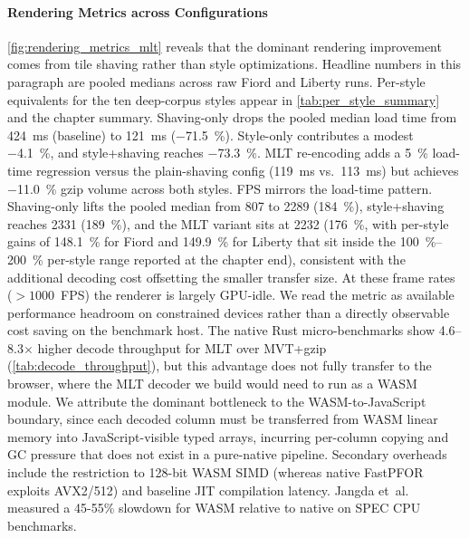 \paragraph{Rendering Metrics across Configurations}
\cref{fig:rendering_metrics_mlt} reveals that the dominant rendering improvement comes from tile shaving rather than style optimizations.
Headline numbers in this paragraph are pooled medians across raw Fiord and Liberty runs.
Per-style equivalents for the ten deep-corpus styles appear in \cref{tab:per_style_summary} and the chapter summary.
Shaving-only drops the pooled median load time from \qty{424}{\milli\second} (baseline) to \qty{121}{\milli\second} (\qty{-71.5}{\percent}).
Style-only contributes a modest \qty{-4.1}{\percent}, and style+shaving reaches \qty{-73.3}{\percent}.
\ac{MLT} re-encoding adds a \qty{+5}{\percent} load-time regression versus the plain-shaving config (\qty{119}{\milli\second} vs.\ \qty{113}{\milli\second}) but achieves \qty{-11.0}{\percent} gzip volume across both styles.
\ac{FPS} mirrors the load-time pattern.
Shaving-only lifts the pooled median from 807 to \num{2289} (\qty{+184}{\percent}), style+shaving reaches \num{2331} (\qty{+189}{\percent}), and the \ac{MLT} variant sits at \num{2232} (\qty{+176}{\percent}, with per-style gains of \qty{+148.1}{\percent} for Fiord and \qty{+149.9}{\percent} for Liberty that sit inside the \qtyrange{100}{200}{\percent} per-style range reported at the chapter end), consistent with the additional decoding cost offsetting the smaller transfer size.
At these frame rates ($>{1000}$~\ac{FPS}) the renderer is largely \ac{GPU}-idle.
We read the metric as available performance headroom on constrained devices rather than a directly observable cost saving on the benchmark host.
The native Rust micro-benchmarks show \numrange{4.6}{8.3}$\times$ higher decode throughput for \ac{MLT} over \ac{MVT}+gzip (\cref{tab:decode_throughput}), but this advantage does not fully transfer to the browser, where the \ac{MLT} decoder we build would need to run as a \ac{WASM} module.
We attribute the dominant bottleneck to the \ac{WASM}-to-JavaScript boundary, since each decoded column must be transferred from \ac{WASM} linear memory into JavaScript-visible typed arrays, incurring per-column copying and \ac{GC} pressure that does not exist in a pure-native pipeline.
Secondary overheads include the restriction to 128-bit \ac{WASM} \ac{SIMD} (whereas native \ac{FastPFOR} exploits AVX2/512) and baseline JIT compilation latency.
Jangda et~al.~\cite{jangdaNotFastAnalyzing2019} measured a 45-55\% slowdown for \ac{WASM} relative to native on SPEC \ac{CPU} benchmarks.
